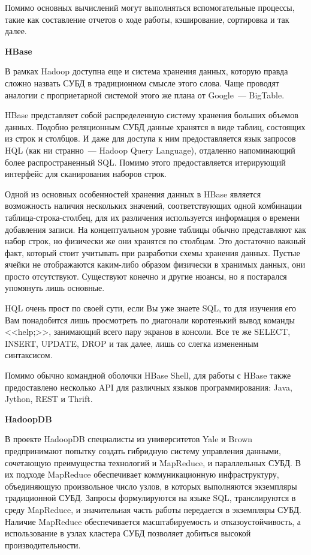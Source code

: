 Помимо основных вычислений могут выполняться вспомогательные процессы, такие как составление отчетов о ходе работы, кэширование,
сортировка и так далее.

\textbf{HBase}

В рамках Hadoop доступна еще и система хранения данных, которую правда сложно назвать СУБД в традиционном смысле этого слова.
Чаще проводят аналогии с проприетарной системой этого же плана от Google~--- BigTable.

HBase представляет собой распределенную систему хранения больших объемов данных. Подобно реляционным СУБД данные хранятся в
виде таблиц, состоящих из строк и столбцов. И даже для доступа к ним предоставляется язык запросов HQL (как ни странно~---
Hadoop Query Language), отдаленно напоминающий более распространенный SQL. Помимо этого предоставляется итерирующий интерфейс
для сканирования наборов строк.

Одной из основных особенностей хранения данных в HBase является возможность наличия нескольких значений,
соответствующих одной комбинации таблица-строка-столбец, для их различения используется информация о времени добавления записи.
На концептуальном уровне таблицы обычно представляют как набор строк, но физически же они хранятся по столбцам. Это достаточно
важный факт, который стоит учитывать при разработки схемы хранения данных. Пустые ячейки не отображаются каким-либо образом
физически в хранимых данных, они просто отсутствуют. Существуют конечно и другие нюансы, но я постарался упомянуть лишь основные.

HQL очень прост по своей сути, если Вы уже знаете SQL, то для изучения его Вам понадобится лишь просмотреть по диагонали
коротенький вывод команды <<help;>>, занимающий всего пару экранов в консоли. Все те же SELECT, INSERT, UPDATE, DROP и так далее,
лишь со слегка измененным синтаксисом.

Помимо обычно командной оболочки HBase Shell, для работы с HBase также предоставлено несколько API для различных языков
программирования: Java, Jython, REST и Thrift.

\textbf{HadoopDB}

В проекте HadoopDB специалисты из университетов Yale и Brown предпринимают попытку создать гибридную систему управления
данными, сочетающую преимущества технологий и MapReduce, и параллельных СУБД. В их подходе MapReduce обеспечивает коммуникационную
инфраструктуру, объединяющую произвольное число узлов, в которых выполняются экземпляры традиционной СУБД. Запросы формулируются
на языке SQL, транслируются в среду MapReduce, и значительная часть работы передается в экземпляры СУБД. Наличие MapReduce
обеспечивается масштабируемость и отказоустойчивость, а использование в узлах кластера СУБД позволяет добиться высокой
производительности.


